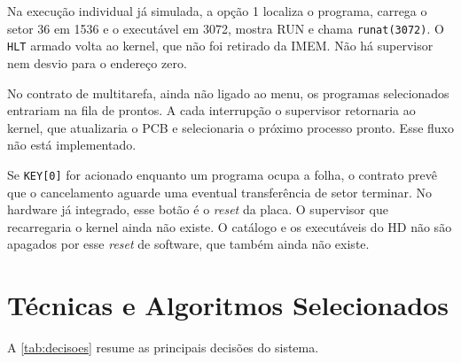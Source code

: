 \documentclass[
    12pt,
    openright,
    a4paper,
    english,
    brazilian
]{abntex2}
\begin{document}
Na execução individual já simulada, a opção 1 localiza o programa, carrega o setor 36 em 1536 e o executável em 3072, mostra RUN e chama \texttt{runat(3072)}. O \texttt{HLT} armado volta ao kernel, que não foi retirado da IMEM. Não há supervisor nem desvio para o endereço zero.

No contrato de multitarefa, ainda não ligado ao menu, os programas selecionados entrariam na fila de prontos. A cada interrupção o supervisor retornaria ao kernel, que atualizaria o PCB e selecionaria o próximo processo pronto. Esse fluxo não está implementado.

Se \texttt{KEY[0]} for acionado enquanto um programa ocupa a folha, o contrato prevê que o cancelamento aguarde uma eventual transferência de setor terminar. No hardware já integrado, esse botão é o \emph{reset} da placa. O supervisor que recarregaria o kernel ainda não existe. O catálogo e os executáveis do HD não são apagados por esse \emph{reset} de software, que também ainda não existe.

\section{Técnicas e Algoritmos Selecionados}

A \autoref{tab:decisoes} resume as principais decisões do sistema.
\end{document}

